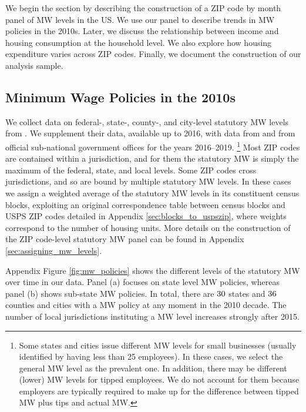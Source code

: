 
We begin the section by describing the construction of a ZIP code by month panel
of MW levels in the US. 
We use our panel to describe trends in MW policies in the 2010s.
Later, we discuss the relationship between income and housing consumption at the
household level.
We also explore how housing expenditure varies across ZIP codes.
Finally, we document the construction of our analysis sample.

\subsection{Minimum Wage Policies in the 2010s}
\label{sec:data_mw_panel}

We collect data on federal-, state-, county-, and city-level statutory MW levels 
from \textcite{VaghulZipperer2016}.
We supplement their data, available up to 2016, with data from 
\textcite{BerkeleyLaborCenter} and from official sub-national government offices 
for the years 2016--2019.%
\footnote{Some states and cities issue different MW levels for small businesses
(usually identified by having less than 25 employees).
In these cases, we select the general MW level as the prevalent one.
In addition, there may be different (lower) MW levels for tipped employees.
We do not account for them because employers are typically required to make up 
for the difference between tipped MW plus tips and actual MW.}
%
%
Most ZIP codes are contained within a jurisdiction, and for them the statutory 
MW is simply the maximum of the federal, state, and local levels.
Some ZIP codes cross jurisdictions, and so are bound by multiple statutory MW 
levels.
In these cases we assign a weighted average of the statutory MW levels in its
constituent census blocks, exploiting an original correspondence table between 
census blocks and USPS ZIP codes detailed in Appendix 
\ref{sec:blocks_to_uspszip}, where weights correspond to the number of housing
units.
More details on the construction of the ZIP code-level statutory MW panel 
can be found in Appendix \ref{sec:assigning_mw_levels}.

Appendix Figure \ref{fig:mw_policies} shows the different levels of the 
statutory MW over time in our data.
Panel (a) focuses on state level MW policies, whereas
panel (b) shows sub-state MW policies.
In total, there are $\textnormal{30}$ states and $\textnormal{36}$ counties and 
cities with a MW policy at any moment in the 2010 decade.
The number of local jurisdictions instituting a MW level increases strongly
after 2015.

